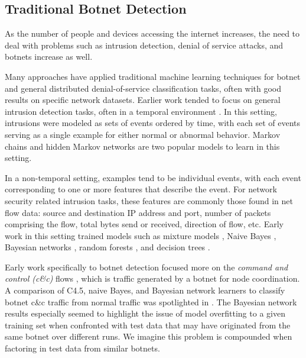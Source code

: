 \documentclass[letterpaper]{article}
\begin{document}
\subsection{Traditional Botnet Detection}

As the number of people and devices accessing the internet increases, the need to deal with problems such as intrusion detection, denial of service attacks, and botnets increase as well.

Many approaches have applied traditional machine learning techniques for botnet and general distributed denial-of-service classification tasks, often with good results on specific network datasets.  Earlier work tended to focus on general intrusion detection tasks, often in a temporal environment \cite{Ye00amarkov,1174909,Joshi:2005:IHM:1167350.1167387,Xu:2007:DDA:1763599.1763621}.  In this setting, intrusions were modeled as sets of events ordered by time, with each set of events serving as a single example for either normal or abnormal behavior. Markov chains and hidden Markov networks are two popular models to learn in this setting.

In a non-temporal setting, examples tend to be individual events, with each event corresponding to one or more features that describe the event.  For network security related intrusion tasks, these features are commonly those found in net flow data: source and destination IP address and port, number of packets comprising the flow, total bytes send or received, direction of flow, etc.  Early work in this setting trained models such as mixture models \cite{Puttini02bayesianclassification}, Naive Bayes \cite{10.1007/978-3-642-00670-8_9}, Bayesian networks \cite{1254306,Xu:2010:IDU:1946417.1946434}, random forests \cite{Zhang:2008:RNI:2220436.2221144}, and decision trees \cite{Osanaiye2016}.

Early work specifically to botnet detection focused more on the \emph{command and control (c\&c)} flows \cite{4116687,Gu2008BotSnifferDB,Cho:2010:IAF:1866307.1866355,EURECOM+3886,DIETRICH2013475}, which is traffic generated by a botnet for node coordination.   A comparison of C4.5, naive Bayes, and Bayesian network learners to classify botnet c\&c traffic from normal traffic was spotlighted in \cite{4116687}.  The Bayesian network results especially seemed to highlight the issue of model overfitting to a given training set when confronted with test data that may have originated from the same botnet over different runs.  We imagine this problem is compounded when factoring in test data from similar botnets.
\end{document}
